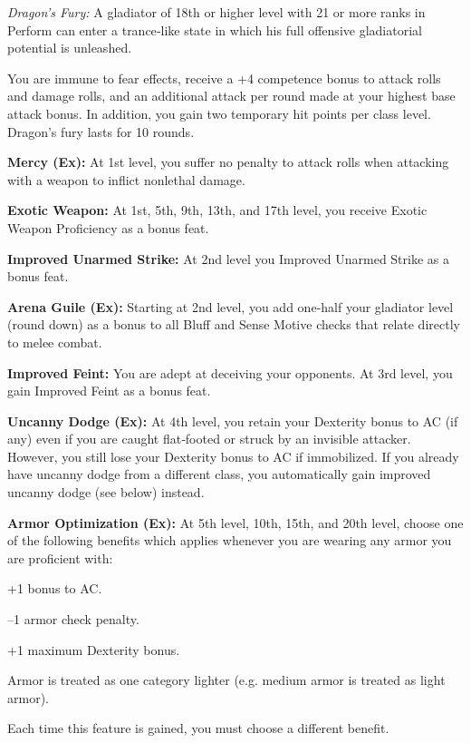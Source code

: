 \textit{Dragon’s Fury:} A gladiator of 18th or higher level with 21 or more ranks in Perform can enter a trance‐like state in which his full offensive gladiatorial potential is unleashed.

You are immune to fear effects, receive a +4 competence bonus to attack rolls and damage rolls, and an additional attack per round made at your highest base attack bonus. In addition, you gain two temporary hit points per class level. Dragon’s fury lasts for 10 rounds.

\textbf{Mercy (Ex):} At 1st level, you suffer no penalty to attack rolls when attacking with a weapon to inflict nonlethal damage.

\textbf{Exotic Weapon:} At 1st, 5th, 9th, 13th, and 17th level, you receive Exotic Weapon Proficiency as a bonus feat.

\textbf{Improved Unarmed Strike:} At 2nd level you Improved Unarmed Strike as a bonus feat.

\textbf{Arena Guile (Ex):} Starting at 2nd level, you add one‐half your gladiator level (round down) as a bonus to all Bluff and Sense Motive checks that relate directly to melee combat.

\textbf{Improved Feint:} You are adept at deceiving your opponents. At 3rd level, you gain Improved Feint as a bonus feat.

\textbf{Uncanny Dodge (Ex):} At 4th level, you retain your Dexterity bonus to AC (if any) even if you are caught flat‐footed or struck by an invisible attacker. However, you still lose your Dexterity bonus to AC if immobilized. If you already have uncanny dodge from a different class, you automatically gain improved uncanny dodge (see below) instead.

\textbf{Armor Optimization (Ex):} At 5th level, 10th, 15th, and 20th level, choose one of the following benefits which applies whenever you are wearing any armor you are proficient with:

\begin{itemize*}
\item +1 bonus to AC.
\item –1 armor check penalty.
\item +1 maximum Dexterity bonus.
\item Armor is treated as one category lighter (e.g. medium armor is treated as light armor).
\end{itemize*}

Each time this feature is gained, you must choose a different benefit.

